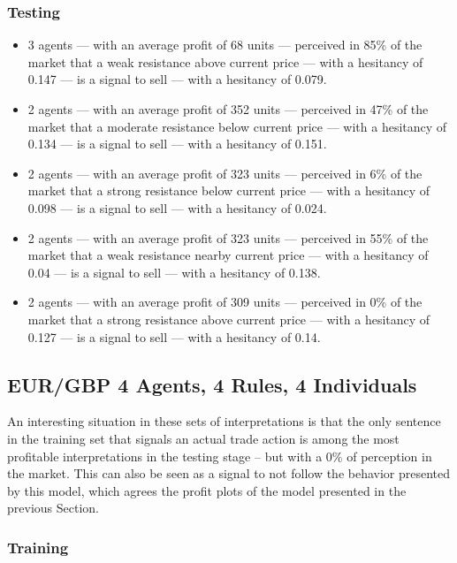 \subsubsection{Testing}

{\small
  \begin{itemize}
  \item 3 agents — with an average profit of 68 units — perceived in 85\% of the
    market that a weak resistance above current price — with a hesitancy of
    0.147 — is a signal to sell — with a hesitancy of 0.079.
  \item 2 agents — with an average profit of 352 units — perceived in 47\% of
    the market that a moderate resistance below current price — with a hesitancy
    of 0.134 — is a signal to sell — with a hesitancy of 0.151.
  \item 2 agents — with an average profit of 323 units — perceived in 6\% of the
    market that a strong resistance below current price — with a hesitancy of
    0.098 — is a signal to sell — with a hesitancy of 0.024.
  \item 2 agents — with an average profit of 323 units — perceived in 55\% of
    the market that a weak resistance nearby current price — with a hesitancy of
    0.04 — is a signal to sell — with a hesitancy of 0.138.
  \item 2 agents — with an average profit of 309 units — perceived in 0\% of the
    market that a strong resistance above current price — with a hesitancy of
    0.127 — is a signal to sell — with a hesitancy of 0.14.
  \end{itemize}
}

\subsection{EUR/GBP 4 Agents, 4 Rules, 4 Individuals}

An interesting situation in these sets of interpretations is that the only
sentence in the training set that signals an actual trade action is among the
most profitable interpretations in the testing stage -- but with a 0\% of
perception in the market. This can also be seen as a signal to not follow the
behavior presented by this model, which agrees the profit plots of the model
presented in the previous Section.

\subsubsection{Training}

